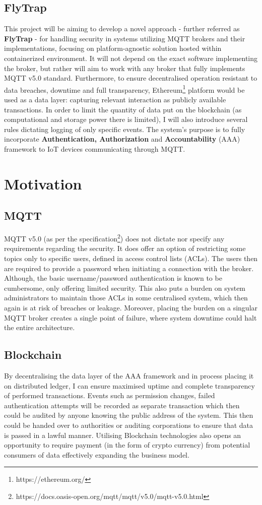 \subsection{FlyTrap}
This project will be aiming to develop a novel approach - further referred as \textbf{FlyTrap} - for handling security in systems utilizing MQTT brokers and their implementations, focusing on platform-agnostic solution hosted within containerized environment. It will not depend on the exact software implementing the broker, but rather will aim to work with any broker that fully implements MQTT v5.0 standard. Furthermore, to ensure decentralised operation resistant to data breaches, downtime and full transparency, Ethereum\footnote{https://ethereum.org/} platform would be used as a data layer: capturing relevant interaction as publicly available transactions. In order to limit the quantity of data put on the blockchain (as computational and storage power there is limited), I will also introduce several rules dictating logging of only specific events. The system's purpose is to fully incorporate \textbf{Authentication, Authorization} and \textbf{Accountability} (AAA) framework to IoT devices communicating through MQTT.

\section{Motivation}

\subsection{MQTT}
MQTT v5.0 (as per the specification\footnote{https://docs.oasis-open.org/mqtt/mqtt/v5.0/mqtt-v5.0.html}) does not dictate nor specify any requirements regarding the security. It does offer an option of restricting some topics only to specific users, defined in access control lists (ACLs). The users then are required to provide a password when initiating a connection with the broker. Although, the basic username/password authentication is known to be cumbersome, only offering limited security. This also puts a burden on system administrators to maintain those ACLs in some centralised system, which then again is at risk of breaches or leakage. Moreover, placing the burden on a singular MQTT broker creates a single point of failure, where system downtime could halt the entire architecture.
\subsection{Blockchain}
By decentralising the data layer of the AAA framework and in process placing it on distributed ledger, I can ensure maximised uptime and complete transparency of performed transactions. Events such as permission changes, failed authentication attempts will be recorded as separate transaction which then could be audited by anyone knowing the public address of the system. This then could be handed over to authorities or auditing corporations to ensure that data is passed in a lawful manner. Utilising Blockchain technologies also opens an opportunity to require payment (in the form of crypto currency) from potential consumers of data effectively expanding the business model. 
